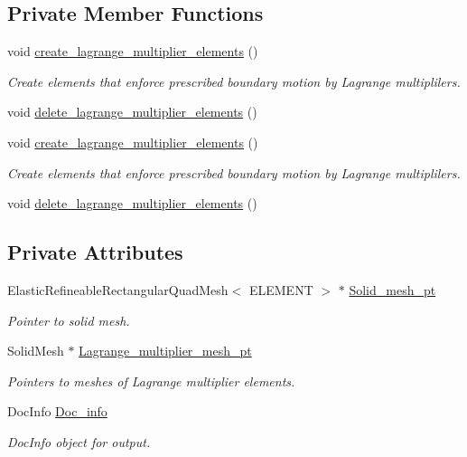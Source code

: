 \subsection*{Private Member Functions}
\begin{DoxyCompactItemize}
\item 
void \hyperlink{classPrescribedBoundaryDisplacementProblem_adf4798f13809f5b2f2be6e3d63421edc}{create\+\_\+lagrange\+\_\+multiplier\+\_\+elements} ()
\begin{DoxyCompactList}\small\item\em Create elements that enforce prescribed boundary motion by Lagrange multiplilers. \end{DoxyCompactList}\item 
void \hyperlink{classPrescribedBoundaryDisplacementProblem_a0204ae947ffd18ed3d7690395901a1e8}{delete\+\_\+lagrange\+\_\+multiplier\+\_\+elements} ()
\item 
void \hyperlink{classPrescribedBoundaryDisplacementProblem_adf4798f13809f5b2f2be6e3d63421edc}{create\+\_\+lagrange\+\_\+multiplier\+\_\+elements} ()
\begin{DoxyCompactList}\small\item\em Create elements that enforce prescribed boundary motion by Lagrange multiplilers. \end{DoxyCompactList}\item 
void \hyperlink{classPrescribedBoundaryDisplacementProblem_a0204ae947ffd18ed3d7690395901a1e8}{delete\+\_\+lagrange\+\_\+multiplier\+\_\+elements} ()
\end{DoxyCompactItemize}
\subsection*{Private Attributes}
\begin{DoxyCompactItemize}
\item 
Elastic\+Refineable\+Rectangular\+Quad\+Mesh$<$ E\+L\+E\+M\+E\+NT $>$ $\ast$ \hyperlink{classPrescribedBoundaryDisplacementProblem_a6d2cdbd9ae1077c80831d938bdb72a61}{Solid\+\_\+mesh\+\_\+pt}
\begin{DoxyCompactList}\small\item\em Pointer to solid mesh. \end{DoxyCompactList}\item 
Solid\+Mesh $\ast$ \hyperlink{classPrescribedBoundaryDisplacementProblem_abb87cb0933297f449af7ceac7fe2bd77}{Lagrange\+\_\+multiplier\+\_\+mesh\+\_\+pt}
\begin{DoxyCompactList}\small\item\em Pointers to meshes of Lagrange multiplier elements. \end{DoxyCompactList}\item 
Doc\+Info \hyperlink{classPrescribedBoundaryDisplacementProblem_aef72ea29567df89d82fe93235f1907f8}{Doc\+\_\+info}
\begin{DoxyCompactList}\small\item\em Doc\+Info object for output. \end{DoxyCompactList}\end{DoxyCompactItemize}


